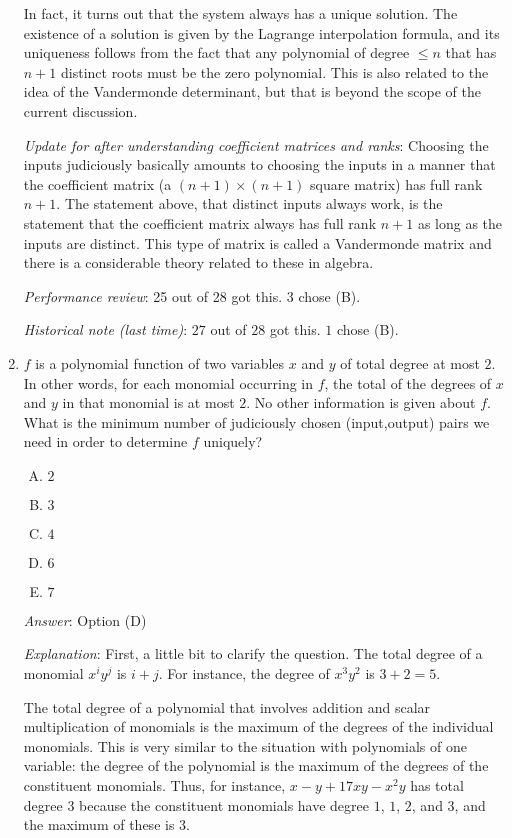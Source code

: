 \documentclass[10pt]{amsart}
\begin{document}
\begin{enumerate}
  In fact, it turns out that the system always has a unique
  solution. The existence of a solution is given by the Lagrange
  interpolation formula, and its uniqueness follows from the fact that
  any polynomial of degree $\le n$ that has $n + 1$ distinct roots
  must be the zero polynomial. This is also related to the idea of the
  Vandermonde determinant, but that is beyond the scope of the current
  discussion.

  {\em Update for after understanding coefficient matrices and ranks}:
  Choosing the inputs judiciously basically amounts to choosing the
  inputs in a manner that the coefficient matrix (a $(n + 1) \times (n
  + 1)$ square matrix) has full rank $n + 1$. The statement above, that
  distinct inputs always work, is the statement that the coefficient
  matrix always has full rank $n + 1$ as long as the inputs are
  distinct. This type of matrix is called a Vandermonde matrix and
  there is a considerable theory related to these in algebra.

  {\em Performance review}: 25 out of 28 got this. 3 chose (B).

  {\em Historical note (last time)}: $27$ out of $28$ got this. $1$ chose (B).

\item $f$ is a polynomial function of two variables $x$ and $y$ of
  total degree at most $2$. In other words, for each monomial
  occurring in $f$, the total of the degrees of $x$ and $y$ in that
  monomial is at most $2$. No other information is given about
  $f$. What is the minimum number of judiciously chosen (input,output)
  pairs we need in order to determine $f$ uniquely?

  \begin{enumerate}[(A)]
  \item $2$
  \item $3$
  \item $4$
  \item $6$
  \item $7$
  \end{enumerate}

  {\em Answer}: Option (D)

  {\em Explanation}: First, a little bit to clarify the question. The
  total degree of a monomial $x^iy^j$ is $i + j$. For instance, the
  degree of $x^3y^2$ is $3 + 2 = 5$.

  The total degree of a polynomial that involves addition and scalar
  multiplication of monomials is the maximum of the degrees of the
  individual monomials. This is very similar to the situation with
  polynomials of one variable: the degree of the polynomial is the
  maximum of the degrees of the constituent monomials. Thus, for
  instance, $x - y + 17xy - x^2y$ has total degree $3$ because the
  constituent monomials have degree $1$, $1$, $2$, and $3$, and the
  maximum of these is $3$.


\end{enumerate}
\end{document}
